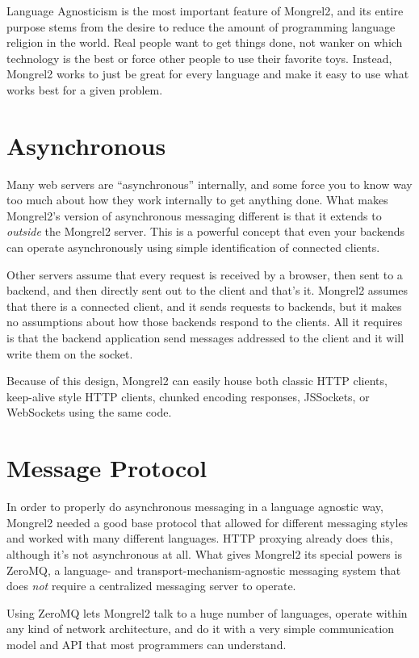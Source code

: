 Language Agnosticism is the most important feature of Mongrel2, and its entire
purpose stems from the desire to reduce the amount of programming language
religion in the world.  Real people want to get things done, not wanker on
which technology is the best or force other people to use their favorite toys.
Instead, Mongrel2 works to just be great for every language and make it easy
to use what works best for a given problem.


\section{Asynchronous}

Many web servers are ``asynchronous'' internally, and some force you to
know way too much about how they work internally to get anything done.  What makes
Mongrel2's version of asynchronous messaging different is that it extends to
\emph{outside} the Mongrel2 server.  This is a powerful concept that even your backends
can operate asynchronously using simple identification of connected clients.

Other servers assume that every request is received by a browser, then sent to a backend,
and then directly sent out to the client and that's it.  Mongrel2 assumes that there
is a connected client, and it sends requests to backends, but it makes no assumptions
about how those backends respond to the clients.  All it requires is that the backend
application send messages addressed to the client and it will write them on the
socket.

Because of this design, Mongrel2 can easily house both classic HTTP clients, keep-alive
style HTTP clients, chunked encoding responses, JSSockets, or WebSockets using the same
code.


\section{Message Protocol}

In order to properly do asynchronous messaging in a language agnostic way, Mongrel2
needed a good base protocol that allowed for different messaging styles and worked
with many different languages.  HTTP proxying already does this, although it's not
asynchronous at all.  What gives Mongrel2 its special powers is ZeroMQ, a language-
and transport-mechanism-agnostic messaging system that does \emph{not} require a
centralized messaging server to operate.

Using ZeroMQ lets Mongrel2 talk to a huge number of languages, operate within any
kind of network architecture, and do it with a very simple communication model and
API that most programmers can understand.


